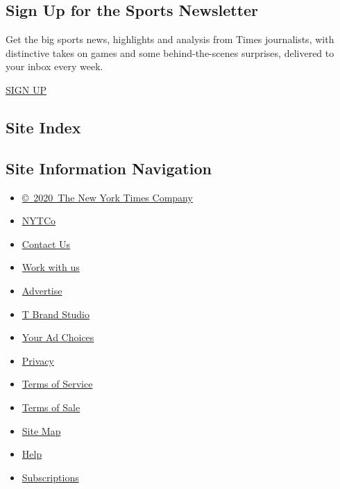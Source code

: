 \hypertarget{sign-up-for-the-sports-newsletter}{%
\subsection{Sign Up for the Sports
Newsletter}\label{sign-up-for-the-sports-newsletter}}

Get the big sports news, highlights and analysis from Times journalists,
with distinctive takes on games and some behind-the-scenes surprises,
delivered to your inbox every week.

\href{/newsletters/signup/SP}{SIGN UP}

\hypertarget{site-index}{%
\subsection{Site Index}\label{site-index}}

\hypertarget{site-information-navigation}{%
\subsection{Site Information
Navigation}\label{site-information-navigation}}

\begin{itemize}
\tightlist
\item
  \href{https://help.nytimes3xbfgragh.onion/hc/en-us/articles/115014792127-Copyright-notice}{©~2020~The
  New York Times Company}
\end{itemize}

\begin{itemize}
\tightlist
\item
  \href{https://www.nytco.com/}{NYTCo}
\item
  \href{https://help.nytimes3xbfgragh.onion/hc/en-us/articles/115015385887-Contact-Us}{Contact
  Us}
\item
  \href{https://www.nytco.com/careers/}{Work with us}
\item
  \href{https://nytmediakit.com/}{Advertise}
\item
  \href{http://www.tbrandstudio.com/}{T Brand Studio}
\item
  \href{https://www.nytimes3xbfgragh.onion/privacy/cookie-policy\#how-do-i-manage-trackers}{Your
  Ad Choices}
\item
  \href{https://www.nytimes3xbfgragh.onion/privacy}{Privacy}
\item
  \href{https://help.nytimes3xbfgragh.onion/hc/en-us/articles/115014893428-Terms-of-service}{Terms
  of Service}
\item
  \href{https://help.nytimes3xbfgragh.onion/hc/en-us/articles/115014893968-Terms-of-sale}{Terms
  of Sale}
\item
  \href{https://spiderbites.nytimes3xbfgragh.onion}{Site Map}
\item
  \href{https://help.nytimes3xbfgragh.onion/hc/en-us}{Help}
\item
  \href{https://www.nytimes3xbfgragh.onion/subscription?campaignId=37WXW}{Subscriptions}
\end{itemize}
